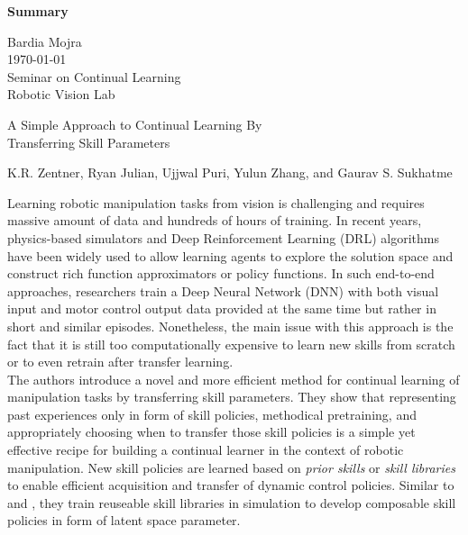 \documentclass[12pt]{article}
\begin{document}
\begin{center}
\textbf{Summary}\\
\end{center}

\noindent
Bardia Mojra\\
\today\\
Seminar on Continual Learning\\
Robotic Vision Lab\\
\begin{center}
A Simple Approach to Continual Learning By\\
Transferring Skill Parameters\\
\end{center}
\begin{center}
  {\small K.R. Zentner, Ryan Julian, Ujjwal Puri, Yulun Zhang, and Gaurav S. Sukhatme}\\
\end{center}

Learning robotic manipulation tasks from vision is challenging and requires
massive amount of data and hundreds of hours of training. In recent years,
physics-based simulators and Deep Reinforcement Learning (DRL) algorithms have
been widely
used to allow learning agents to explore the solution space and construct rich
function approximators or policy functions. In such end-to-end approaches,
researchers train a Deep Neural Network (DNN) with both visual input and
motor control output data provided at the same time but rather in short and
similar episodes. Nonetheless, the main issue with this approach is the fact
that it is still too computationally expensive to learn new skills from scratch or
to even retrain after transfer learning.\\

The authors introduce a novel and more efficient method for
continual learning of manipulation tasks by transferring skill parameters. They
show that representing past experiences only in form of skill policies,
methodical pretraining, and appropriately choosing when to
transfer those skill policies is a simple yet effective recipe for building a
continual learner in the context of robotic manipulation. New skill policies are
learned based on \textit{prior skills} or \textit{skill libraries} to enable
efficient acquisition and transfer of dynamic control policies. Similar to
\cite{hausman2018learning} and \cite{julian2018scaling}, they train reuseable
skill libraries in simulation to develop composable skill policies in form
of latent space parameter.
\end{document}
